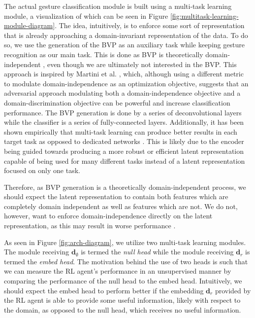 The actual gesture classification module is built using a multi-task learning module, a visualization of which can be seen in Figure \ref{fig:multitask-learning-module-diagram}.
The idea, intuitively, is to enforce some sort of representation that is already approaching a domain-invariant representation of the data.
To do so, we use the generation of the BVP as an auxiliary task while keeping gesture recognition as our main task.
This is done as BVP is theoretically domain-independent \cite{zheng2019zero}, even though we are ultimately not interested in the BVP.
This approach is inspired by Martini et al. \cite{martini2021domain}, which, although using a different metric to modulate domain-independence as an optimization objective, suggests that an adversarial approach modulating both a domain-independence objective and a domain-discrimination objective can be powerful and increase classification performance.
The BVP generation is done by a series of deconvolutional layers while the classifier is a series of fully-connected layers.
Additionally, it has been shown empirically that multi-task learning can produce better results in each target task as opposed to dedicated networks \cite{tuggener2021deepscoresv2}.
This is likely due to the encoder being guided towards producing a more robust or efficient latent representation capable of being used for many different tasks instead of a latent representation focused on only one task.

Therefore, as BVP generation is a theoretically domain-independent process, we should expect the latent representation to contain both features which are completely domain independent as well as features which are not.
We do not, however, want to enforce domain-independence directly on the latent representation, as this may result in worse performance \cite{van2022insights}.

As seen in Figure \ref{fig:arch-diagram}, we utilize two multi-task learning modules. The module receiving $\boldsymbol{d}_\emptyset$ is termed the \textit{null head} while the module receiving $\boldsymbol{d}_r$ is termed the \textit{embed head}. 
The motivation behind the use of two heads is such that we can measure the RL agent's performance in an unsupervised manner by comparing the performance of the null head to the embed head.
Intuitively, we should expect the embed head to perform better if the embedding $\boldsymbol{d}_r$ provided by the RL agent is able to provide some useful information, likely with respect to the domain, as opposed to the null head, which receives no useful information.


